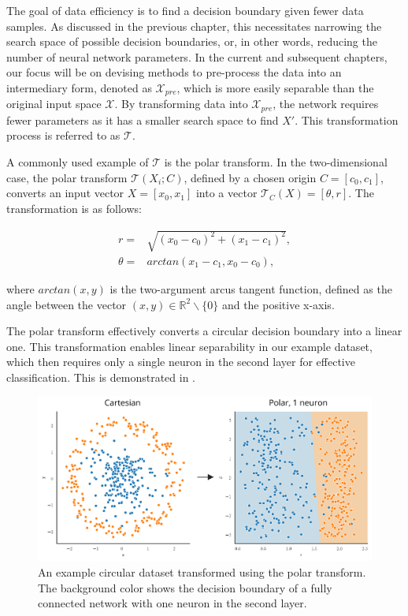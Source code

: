 
The goal of data efficiency is to find a decision boundary given fewer data samples. As discussed in the previous chapter, this necessitates narrowing the search space of possible decision boundaries, or, in other words, reducing the number of neural network parameters. In the current and subsequent chapters, our focus will be on devising methods to pre-process the data into an intermediary form, denoted as \(\mathcal{X}_{pre}\), which is more easily separable than the original input space \(\mathcal{X}\). By transforming data into \(\mathcal{X}_{pre}\), the network requires fewer parameters as it has a smaller search space to find \(X'\). This transformation process is referred to as \(\mathcal{T}\).

A commonly used example of $\mathcal{T}$ is the polar transform. In the two-dimensional case, the polar transform \(\mathcal{T}(X_i; C)\), defined by a chosen origin \(C = [c_0, c_1]\), converts an input vector \(X = [x_0, x_1]\) into a vector \(\mathcal{T}_C(X) = [\theta, r]\). The transformation is as follows:

\begin{equation}
    \begin{aligned}
	r =& \sqrt{(x_0 - c_0)^2 + (x_1 - c_1)^2},\\
	\theta =& arctan(x_1 - c_1, x_0 - c_0),
    \end{aligned}
\end{equation}

where $arctan(x, y)$ is the two-argument arcus tangent function, defined as the angle between the vector $(x, y) \in \mathbb{R}^2 \backslash\{0\}$ and the positive x-axis.

The polar transform effectively converts a circular decision boundary into a linear one. This transformation enables linear separability in our example dataset, which then requires only a single neuron in the second layer for effective classification. This is demonstrated in .

	\begin{figure}[h]
		\centering
		\includegraphics[width=0.65\linewidth]{images/4/polar_dataset_neurons}
		\caption{An example circular dataset transformed using the polar transform. The background color shows the decision boundary of a fully connected network with one neuron in the second layer.}
		\label{fig:polar_dataset_neurons}
	\end{figure}
	

